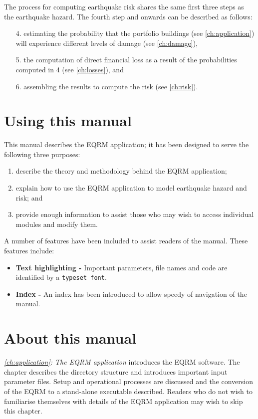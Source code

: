 The process for computing earthquake risk shares the same first
three steps as the earthquake hazard. The fourth step and onwards
can be described as follows:
\begin{enumerate}
\item[4.] estimating the probability that the portfolio buildings
(see \cref{ch:application}) will experience different levels of damage
(see \cref{ch:damage}), \item[5.] the computation of direct
financial loss as a result of the probabilities computed in 4 (see
\cref{ch:losses}), and \item[6.] assembling the results to compute
the risk (see \cref{ch:risk}).
\end{enumerate}

\section{Using this manual}

This manual describes the EQRM application; it has been designed
to serve the following three purposes:
\begin{enumerate}
\item describe the theory and methodology behind the EQRM
application; \item explain how to use the EQRM application to
model earthquake hazard and risk; and \item provide enough
information to assist those who may wish to access individual
modules and modify them.
\end{enumerate}

A number of features have been included to assist readers of the
manual. These features include:
\begin{itemize}
\item \textbf{Text highlighting -} Important parameters, file
names and code are identified by a \texttt{typeset font}. \item
\textbf{Index -} An index has been introduced to allow speedy of
navigation of the manual.

\end{itemize}


\section{About this manual}

\textit{\cref{ch:application}: The EQRM application} introduces
the EQRM software. The chapter describes the directory structure
and introduces important input parameter files. Setup and
operational processes are discussed and the conversion of the EQRM
to a stand-alone executable described. Readers who do not wish to
familiarise themselves with details of the EQRM application may
wish to skip this chapter.

